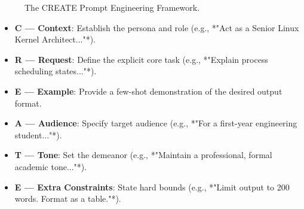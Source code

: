 \begin{figure}[htbp]
\centering
{}
\caption{The CREATE Prompt Engineering Framework.}
\label{fig:create-framework}
\end{figure}

\begin{itemize}[leftmargin=1.5em]
    \item \textbf{C --- Context}: Establish the persona and role (e.g., *"Act as a Senior Linux Kernel Architect..."*).
    \item \textbf{R --- Request}: Define the explicit core task (e.g., *"Explain process scheduling states..."*).
    \item \textbf{E --- Example}: Provide a few-shot demonstration of the desired output format.
    \item \textbf{A --- Audience}: Specify target audience (e.g., *"For a first-year engineering student..."*).
    \item \textbf{T --- Tone}: Set the demeanor (e.g., *"Maintain a professional, formal academic tone..."*).
    \item \textbf{E --- Extra Constraints}: State hard bounds (e.g., *"Limit output to 200 words. Format as a table."*).
\end{itemize}

